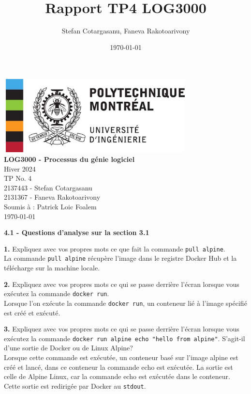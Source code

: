 \documentclass[12pt, letterpaper]{report}
\begin{document}
\title{Rapport TP4 LOG3000}
\author{Stefan Cotargasanu, Faneva Rakotoarivony}
\date{\today}

\begin{center}
	\thispagestyle{empty}
	\includegraphics[width=10cm, height=4cm]{logo-polymtl.png}\\ 
	\textbf{LOG3000 - Processus du génie logiciel} \\
	Hiver 2024 \\ 
	TP No. 4 \\ 
	2137443 - Stefan Cotargasanu \\
	2131367 - Faneva Rakotoarivony \\
	Soumis à : Patrick Loic Foalem \\
	\today
\end{center}
\pagebreak

\textbf{4.1 -  Questions d'analyse sur la section 3.1}

\textbf{1.} Expliquez avec vos propres mots ce que fait la commande \texttt{pull alpine}. \\
La commande \texttt{pull alpine} récupère l'image dans le registre Docker Hub et la télécharge sur la machine locale.
\newline 

\textbf{2.} Expliquez avec vos propres mots ce qui se passe derrière l'écran lorsque vous exécutez la commande \texttt{docker run}. \\
Lorsque l'on exécute la commande \texttt{docker run}, un conteneur lié à l'image spécifié est créé et exécuté.
\newline

\textbf{3.} Expliquez avec vos propres mots ce qui se passe derrière l'écran lorsque vous exécutez la commande \texttt{docker run alpine echo "hello from alpine"}. S'agit-il d'une sortie de Docker ou de Linux Alpine? \\
Lorsque cette commande est exécutée, un conteneur basé sur l'image alpine est créé et lancé, dans ce conteneur la commande echo est exécutée. La sortie est celle de Alpine Linux, car la commande echo est exécutée dans le conteneur. Cette sortie est redirigée par Docker au \texttt{stdout}.
\newline
\end{document}
